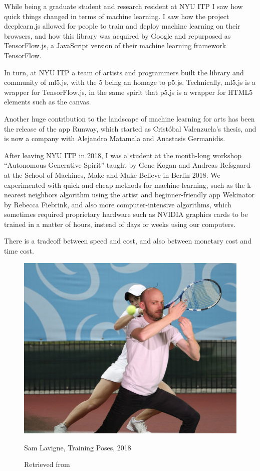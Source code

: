 While being a graduate student and research resident at NYU ITP I saw how quick things changed in terms of machine learning. I saw how the project deeplearn.js allowed for people to train and deploy machine learning on their browsers, and how this library was acquired by Google and repurposed as TensorFlow.js, a JavaScript version of their machine learning framework TensorFlow.

In turn, at NYU ITP a team of artists and programmers built the library and community of ml5.js, with the 5 being an homage to p5.js. Technically, ml5.js is a wrapper for TensorFlow.js, in the same spirit that p5.js is a wrapper for HTML5 elements such as the canvas.

Another huge contribution to the landscape of machine learning for arts has been the release of the app Runway, which started as Cristóbal Valenzuela’s thesis, and is now a company with Alejandro Matamala and Anastasis Germanidis.

After leaving NYU ITP in 2018, I was a student at the month-long workshop “Autonomous Generative Spirit” taught by Gene Kogan and Andreas Refsgaard at the School of Machines, Make and Make Believe in Berlin 2018. We experimented with quick and cheap methods for machine learning, such as the k-nearest neighbors algorithm using the artist and beginner-friendly app Wekinator by Rebecca Fiebrink, and also more computer-intensive algorithms, which sometimes required proprietary hardware such as NVIDIA graphics cards to be trained in a matter of hours, instead of days or weeks using our computers.

There is a tradeoff between speed and cost, and also between monetary cost and time cost.

\begin{figure}[ht]
  \centering
    \includegraphics[width=0.75\linewidth,height=0.25\textheight,keepaspectratio]{images/sam-lavigne-training-poses.jpg}
  \caption{Sam Lavigne, Training Poses, 2018}
  \caption*{Retrieved from \cite{website-sam-lavigne-training-poses}}
  \label{fig:sam-lavigne-training-poses}
\end{figure}

